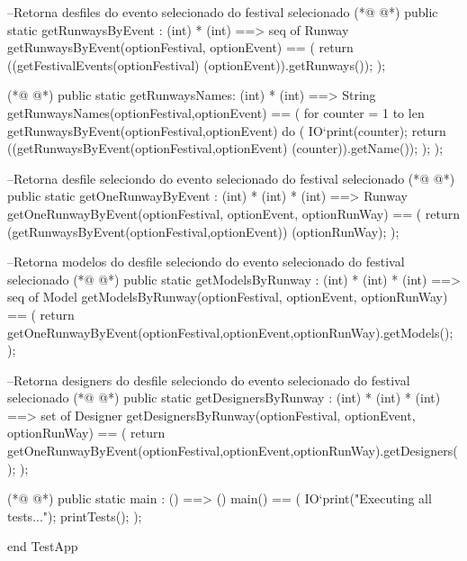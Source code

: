 \begin{vdmpp}[breaklines=true]
 --Retorna desfiles do evento selecionado do festival selecionado
(*@
\label{getRunwaysByEvent:80}
@*)
  public static getRunwaysByEvent : (int) * (int) ==> seq of Runway
 getRunwaysByEvent(optionFestival, optionEvent) ==
 (
  return ((getFestivalEvents(optionFestival) (optionEvent)).getRunways());
 );
 
(*@
\label{getRunwaysNames:86}
@*)
 public static getRunwaysNames: (int) * (int) ==> String
  getRunwaysNames(optionFestival,optionEvent) ==
  ( 
    for counter = 1 to len getRunwaysByEvent(optionFestival,optionEvent) do (
    IO`print(counter);
    return ((getRunwaysByEvent(optionFestival,optionEvent) (counter)).getName());
    );
  );
  
 --Retorna desfile seleciondo do evento selecionado do festival selecionado
(*@
\label{getOneRunwayByEvent:96}
@*)
  public static getOneRunwayByEvent : (int) * (int) * (int) ==> Runway
 getOneRunwayByEvent(optionFestival, optionEvent, optionRunWay) ==
 (
  return (getRunwaysByEvent(optionFestival,optionEvent)) (optionRunWay);
 );
 
 --Retorna modelos do desfile seleciondo do evento selecionado do festival selecionado
(*@
\label{getModelsByRunway:103}
@*)
 public static getModelsByRunway : (int) * (int) * (int) ==> seq of Model
 getModelsByRunway(optionFestival, optionEvent, optionRunWay) ==
 (
 return getOneRunwayByEvent(optionFestival,optionEvent,optionRunWay).getModels();
 );
    
   
  --Retorna designers do desfile seleciondo do evento selecionado do festival selecionado  
(*@
\label{getDesignersByRunway:111}
@*)
  public static getDesignersByRunway : (int) * (int) * (int) ==> set of Designer
 getDesignersByRunway(optionFestival, optionEvent, optionRunWay) ==
 (
 return getOneRunwayByEvent(optionFestival,optionEvent,optionRunWay).getDesigners();
 );
  

(*@
\label{main:118}
@*)
public static main : () ==> ()
  main() ==
  (
   IO`print("Executing all tests...\n");
   printTests();
  );

end TestApp
\end{vdmpp}
\bigskip
